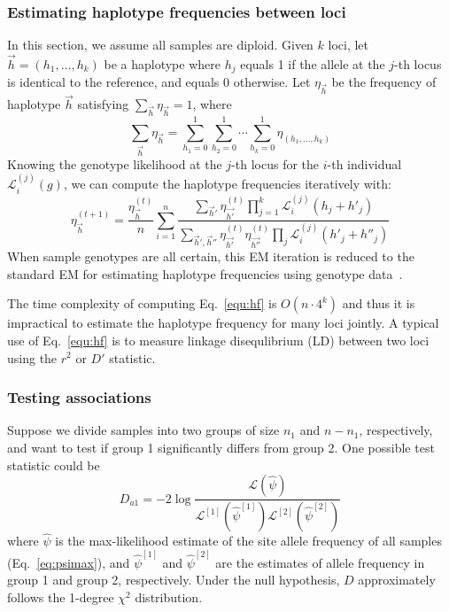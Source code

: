 \documentclass{bioinfo}
\begin{document}
\begin{methods}
\subsubsection{Estimating haplotype frequencies between loci}
In this section, we assume all samples are diploid. Given $k$ loci,
let $\vec{h}=(h_1,\ldots,h_k)$ be a haplotype where $h_j$ equals 1 if
the allele at the $j$-th locus is identical to the reference, and equals 0 otherwise.
Let $\eta_{\vec{h}}$ be the frequency of haplotype $\vec{h}$ satisfying
$\sum_{\vec{h}}\eta_{\vec{h}}=1$, where
$$
\sum_{\vec{h}}\eta_{\vec{h}}=\sum_{h_1=0}^1\sum_{h_2=0}^1\cdots\sum_{h_k=0}^1\eta_{(h_1,\ldots,h_k)}
$$
Knowing the genotype likelihood at the $j$-th locus for the $i$-th individual $\mathcal{L}^{(j)}_i(g)$, we
can compute the haplotype frequencies iteratively with:
\begin{equation}\label{equ:hf}
\eta^{(t+1)}_{\vec{h}}=\frac{\eta_{\vec{h}}^{(t)}}{n}\sum_{i=1}^n\frac{\sum_{\vec{h}'}\eta_{\vec{h'}}^{(t)}\prod_{j=1}^k\mathcal{L}^{(j)}_i(h_j+h'_j)}
{\sum_{\vec{h}',\vec{h}''}\eta_{\vec{h'}}^{(t)}\eta_{\vec{h''}}^{(t)}\prod_{j}\mathcal{L}^{(j)}_i(h'_j+h''_j)}
\end{equation}
When sample genotypes are all certain, this EM iteration is reduced to the standard EM for estimating
haplotype frequencies using genotype data~\citep{Excoffier:1995ly}.

The time complexity of computing Eq.~\eqref{equ:hf} is $O(n\cdot 4^k)$ and thus
it is impractical to estimate the haplotype frequency for many loci jointly.
A typical use of Eq.~\eqref{equ:hf} is to measure linkage disequlibrium
(LD) between two loci using the $r^2$ or $D'$ statistic.

\subsubsection{Testing associations}
Suppose we divide samples into two groups of size $n_1$ and $n-n_1$, respectively, and
want to test if group 1 significantly differs from group 2. One possible test statistic
could be
\begin{equation}\label{eq:asso1}
D_{a1}=-2\log\frac{\mathcal{L}(\hat{\psi})}{\mathcal{L}^{[1]}(\hat{\psi}^{[1]})\mathcal{L}^{[2]}(\hat{\psi}^{[2]})}
\end{equation}
where $\hat{\psi}$ is the max-likelihood estimate of the site allele frequency of all samples (Eq.~\eqref{eq:psimax}),
and $\hat{\psi}^{[1]}$ and $\hat{\psi}^{[2]}$ are the estimates of allele frequency in group 1 and group 2, respectively.
Under the null hypothesis, $D$ approximately follows the 1-degree $\chi^2$ distribution.


\end{methods}
\end{document}
